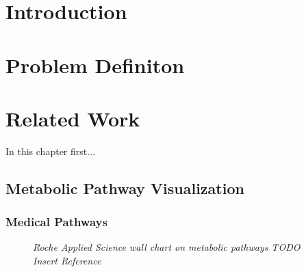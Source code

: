 \chapter{Introduction}

\chapter{Problem Definiton}


\chapter{Related Work}

In this chapter first...

\section{Metabolic Pathway Visualization}

\subsection{Medical Pathways}

\begin{figure}[ht]
\centering
{} 
\caption[Roche Applied Science wall chart on metabolic pathways]{\textit{Roche Applied Science wall chart on metabolic pathways TODO Insert Reference}} 
\label{gfx:RocheAppliedScience_MetabolicPathways_WallChart}
\end{figure}

